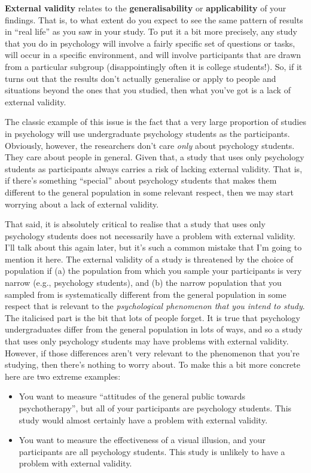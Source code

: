 \documentclass[
  a4paper,
]{book}
\providecommand{\tightlist}{%
  \setlength{\itemsep}{0pt}\setlength{\parskip}{0pt}}\usepackage{longtable,booktabs,array}
\begin{document}
\textbf{External validity} relates to the \textbf{generalisability} or
\textbf{applicability} of your findings. That is, to what extent do you
expect to see the same pattern of results in ``real life'' as you saw in
your study. To put it a bit more precisely, any study that you do in
psychology will involve a fairly specific set of questions or tasks,
will occur in a specific environment, and will involve participants that
are drawn from a particular subgroup (disappointingly often it is
college students!). So, if it turns out that the results don't actually
generalise or apply to people and situations beyond the ones that you
studied, then what you've got is a lack of external validity.

The classic example of this issue is the fact that a very large
proportion of studies in psychology will use undergraduate psychology
students as the participants. Obviously, however, the researchers don't
care \emph{only} about psychology students. They care about people in
general. Given that, a study that uses only psychology students as
participants always carries a risk of lacking external validity. That
is, if there's something ``special'' about psychology students that
makes them different to the general population in some relevant respect,
then we may start worrying about a lack of external validity.

That said, it is absolutely critical to realise that a study that uses
only psychology students does not necessarily have a problem with
external validity. I'll talk about this again later, but it's such a
common mistake that I'm going to mention it here. The external validity
of a study is threatened by the choice of population if (a) the
population from which you sample your participants is very narrow (e.g.,
psychology students), and (b) the narrow population that you sampled
from is systematically different from the general population in some
respect that is relevant to the \emph{psychological phenomenon that you
intend to study}. The italicised part is the bit that lots of people
forget. It is true that psychology undergraduates differ from the
general population in lots of ways, and so a study that uses only
psychology students may have problems with external validity. However,
if those differences aren't very relevant to the phenomenon that you're
studying, then there's nothing to worry about. To make this a bit more
concrete here are two extreme examples:

\begin{itemize}
\tightlist
\item
  You want to measure ``attitudes of the general public towards
  psychotherapy'', but all of your participants are psychology students.
  This study would almost certainly have a problem with external
  validity.
\item
  You want to measure the effectiveness of a visual illusion, and your
  participants are all psychology students. This study is unlikely to
  have a problem with external validity.
\end{itemize}
\end{document}
